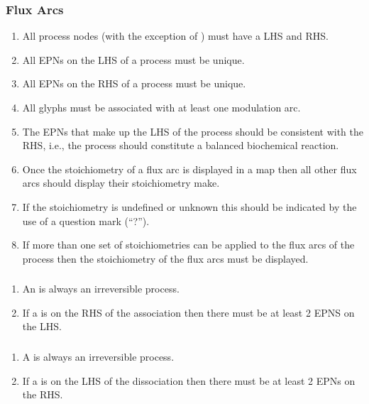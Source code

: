 \subsubsection{Flux Arcs}

\begin{enumerate}
\item All process nodes (with the exception of ) must have a LHS and RHS.
    \item All EPNs on the LHS of a process must be unique.
    \item All EPNs on the RHS of a process must be unique.
    \item All  glyphs must be associated with at least one modulation arc.
    \item The EPNs that make up the LHS of the process should be consistent with the RHS, i.e., the process should constitute a    balanced biochemical reaction.
    \item Once the stoichiometry of a flux arc is displayed in a map then all other flux arcs should
    display their stoichiometry make.
    \item If the stoichiometry is undefined or unknown this should be indicated by the use of a question mark (``?''). 
   \item If more than one set of stoichiometries can be applied to the flux arcs of the process then the stoichiometry of the flux arcs must be displayed.
\end{enumerate}  

\subsubsection{}

  \begin{enumerate}
    \item An  is always an irreversible process.
    \item If a  is on the RHS of the association then
  there must be at least 2 EPNS on the LHS.
\end{enumerate}  

\subsubsection{}
  \begin{enumerate}
    \item A  is always an irreversible process.
    \item If a  is on the LHS of the dissociation then there must be at least 2 EPNs on the RHS.
\end{enumerate}  

